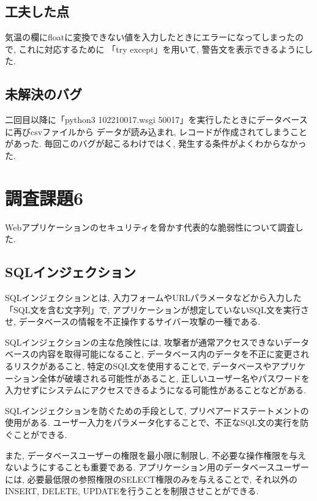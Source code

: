 \documentclass{ltjsarticle} %
\begin{document}
\subsection{工夫した点}
気温の欄にfloatに変換できない値を入力したときにエラーになってしまったので, これに対応するために
「try except」を用いて, 警告文を表示できるようにした. 

\subsection{未解決のバグ}
二回目以降に「python3 102210017.wsgi 50017」を実行したときにデータベースに再びcsvファイルから
データが読み込まれ, レコードが作成されてしまうことがあった. 毎回このバグが起こるわけではく, 発生する条件がよくわからなかった. 

\section{調査課題6}
Webアプリケーションのセキュリティを脅かす代表的な脆弱性について調査した. 

\subsection{SQLインジェクション}
SQLインジェクションとは, 入力フォームやURLパラメータなどから入力した「SQL文を含む文字列」で, 
アプリケーションが想定していないSQL文を実行させ, データベースの情報を不正操作するサイバー攻撃の一種である. 

\vspace*{0.5cm}

SQLインジェクションの主な危険性には, 攻撃者が通常アクセスできないデータベースの内容を取得可能になること, 
データベース内のデータを不正に変更されるリスクがあること, 
特定のSQL文を使用することで, データベースやアプリケーション全体が破壊される可能性があること, 
正しいユーザー名やパスワードを入力せずにシステムにアクセスできるようになる可能性があることなどがある. 

\vspace*{0.5cm}

SQLインジェクションを防ぐための手段として, プリペアードステートメントの使用がある. 
ユーザー入力をパラメータ化することで、不正なSQL文の実行を防ぐことができる. 

また, データベースユーザーの権限を最小限に制限し, 不必要な操作権限を与えないようにすることも重要である. 
アプリケーション用のデータベースユーザーには, 必要最低限の参照権限のSELECT権限のみを与えることで, 
それ以外のINSERT, DELETE, UPDATEを行うことを制限させことができる. 
\end{document}
